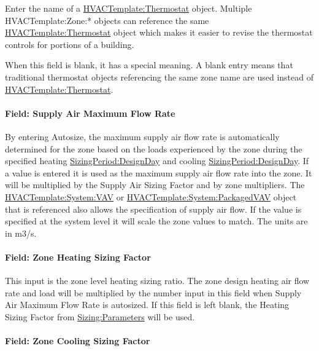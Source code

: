 Enter the name of a \hyperref[hvactemplatethermostat]{HVACTemplate:Thermostat} object. Multiple HVACTemplate:Zone:* objects can reference the same \hyperref[hvactemplatethermostat]{HVACTemplate:Thermostat} object which makes it easier to revise the thermostat controls for portions of a building.

When this field is blank, it has a special meaning. A blank entry means that traditional thermostat objects referencing the same zone name are used instead of \hyperref[hvactemplatethermostat]{HVACTemplate:Thermostat}.

\paragraph{Field: Supply Air Maximum Flow Rate}\label{field-supply-air-maximum-flow-rate-2}

By entering Autosize, the maximum supply air flow rate is automatically determined for the zone based on the loads experienced by the zone during the specified heating \hyperref[sizingperioddesignday]{SizingPeriod:DesignDay} and cooling \hyperref[sizingperioddesignday]{SizingPeriod:DesignDay}. If a value is entered it is used as the maximum supply air flow rate into the zone. It will be multiplied by the Supply Air Sizing Factor and by zone multipliers. The \hyperref[hvactemplatesystemvav]{HVACTemplate:System:VAV} or \hyperref[hvactemplatesystempackagedvav]{HVACTemplate:System:PackagedVAV} object that is referenced also allows the specification of supply air flow. If the value is specified at the system level it will scale the zone values to match. The units are in m3/s.

\paragraph{Field: Zone Heating Sizing Factor}\label{field-zone-heating-sizing-factor-7}

This input is the zone level heating sizing ratio. The zone design heating air flow rate and load will be multiplied by the number input in this field when Supply Air Maximum Flow Rate is autosized. If this field is left blank, the Heating Sizing Factor from \hyperref[sizingparameters]{Sizing:Parameters} will be used.

\paragraph{Field: Zone Cooling Sizing Factor}\label{field-zone-cooling-sizing-factor-6}

